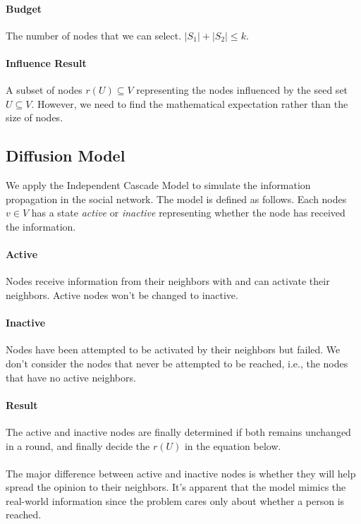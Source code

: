 \documentclass{article}
\begin{document}
\paragraph{Budget} The number of nodes that we can select. $|S_1| + |S_2| \leq k$.
\paragraph{Influence Result} A subset of nodes $r(U) \subseteq V$ representing the nodes influenced by the seed set $U \subseteq V$. However, we need to find the mathematical expectation rather than the size of nodes.

\subsection{Diffusion Model}
We apply the Independent Cascade Model to simulate the information propagation in the social network. The model is defined as follows. Each nodes $v \in V$ has a state \textit{active} or \textit{inactive} representing whether the node has received the information.
\paragraph{Active} Nodes receive information from their neighbors with and can activate their neighbors. Active nodes won't be changed to inactive.
\paragraph{Inactive} Nodes have been attempted to be activated by their neighbors but failed. We don't consider the nodes that never be attempted to be reached, i.e., the nodes that have no active neighbors.
\paragraph{Result} The active and inactive nodes are finally determined if both remains unchanged in a round, and finally decide the $r(U)$ in the equation below.

\paragraph{} The major difference between active and inactive nodes is whether they will help spread the opinion to their neighbors. It's apparent that the model mimics the real-world information since the problem cares only about whether a person is reached.
\end{document}
